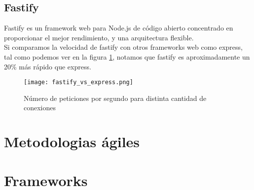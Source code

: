     \subsection{Fastify}

        Fastify es un framework web para Node.js de código abierto concentrado en proporcionar el mejor rendimiento, y una arquitectura flexible. \\

        Si comparamos la velocidad de fastify con otros frameworks web como express, tal como podemos ver en la figura \ref{fig:fastify_vs_express}, notamos que fastify es aproximadamente un 20\% más rápido que express. \\

        \begin{figure}
            \texttt{[image: fastify\_vs\_express.png]}
            \caption{ Número de peticiones por segundo para distinta cantidad de conexiones}
            \label{fig:fastify_vs_express}
        \end{figure}
    


\section{Metodologias ágiles}

    \section{Frameworks}

